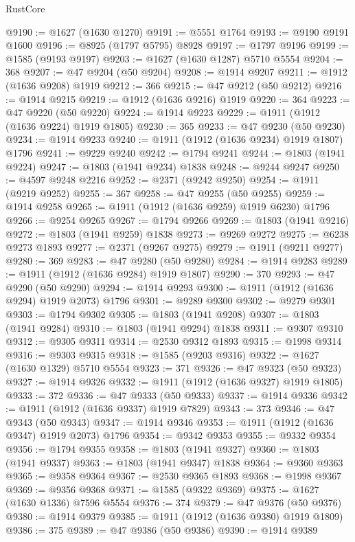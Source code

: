 \begin{lexlean}{RustCore}
\begin{coremodule}
@9190 := @1627 (@1630 @1270)
@9191 := @5551 @1764
@9193 := @9190 @9191 @1600
@9196 := @8925 (@1797 @5795) @8928
@9197 := @1797 @9196
@9199 := @1585 (@9193 @9197)
@9203 := @1627 (@1630 @1287) @5710 @5554
@9204 := 368
@9207 := @47 @9204 (@50 @9204)
@9208 := @1914 @9207
@9211 := @1912 (@1636 @9208) @1919
@9212 := 366
@9215 := @47 @9212 (@50 @9212)
@9216 := @1914 @9215
@9219 := @1912 (@1636 @9216) @1919
@9220 := 364
@9223 := @47 @9220 (@50 @9220)
@9224 := @1914 @9223
@9229 := @1911 (@1912 (@1636 @9224) @1919 @1805)
@9230 := 365
@9233 := @47 @9230 (@50 @9230)
@9234 := @1914 @9233
@9240 := @1911 (@1912 (@1636 @9234) @1919 @1807) @1796
@9241 := @9229 @9240
@9242 := @1794 @9241
@9244 := @1803 (@1941 @9224)
@9247 := @1803 (@1941 @9234) @1838
@9248 := @9244 @9247
@9250 := @4597 @9248 @2216
@9252 := @2371 (@9242 @9250)
@9254 := @1911 (@9219 @9252)
@9255 := 367
@9258 := @47 @9255 (@50 @9255)
@9259 := @1914 @9258
@9265 := @1911 (@1912 (@1636 @9259) @1919 @6230) @1796
@9266 := @9254 @9265
@9267 := @1794 @9266
@9269 := @1803 (@1941 @9216)
@9272 := @1803 (@1941 @9259) @1838
@9273 := @9269 @9272
@9275 := @6238 @9273 @1893
@9277 := @2371 (@9267 @9275)
@9279 := @1911 (@9211 @9277)
@9280 := 369
@9283 := @47 @9280 (@50 @9280)
@9284 := @1914 @9283
@9289 := @1911 (@1912 (@1636 @9284) @1919 @1807)
@9290 := 370
@9293 := @47 @9290 (@50 @9290)
@9294 := @1914 @9293
@9300 := @1911 (@1912 (@1636 @9294) @1919 @2073) @1796
@9301 := @9289 @9300
@9302 := @9279 @9301
@9303 := @1794 @9302
@9305 := @1803 (@1941 @9208)
@9307 := @1803 (@1941 @9284)
@9310 := @1803 (@1941 @9294) @1838
@9311 := @9307 @9310
@9312 := @9305 @9311
@9314 := @2530 @9312 @1893
@9315 := @1998 @9314
@9316 := @9303 @9315
@9318 := @1585 (@9203 @9316)
@9322 := @1627 (@1630 @1329) @5710 @5554
@9323 := 371
@9326 := @47 @9323 (@50 @9323)
@9327 := @1914 @9326
@9332 := @1911 (@1912 (@1636 @9327) @1919 @1805)
@9333 := 372
@9336 := @47 @9333 (@50 @9333)
@9337 := @1914 @9336
@9342 := @1911 (@1912 (@1636 @9337) @1919 @7829)
@9343 := 373
@9346 := @47 @9343 (@50 @9343)
@9347 := @1914 @9346
@9353 := @1911 (@1912 (@1636 @9347) @1919 @2073) @1796
@9354 := @9342 @9353
@9355 := @9332 @9354
@9356 := @1794 @9355
@9358 := @1803 (@1941 @9327)
@9360 := @1803 (@1941 @9337)
@9363 := @1803 (@1941 @9347) @1838
@9364 := @9360 @9363
@9365 := @9358 @9364
@9367 := @2530 @9365 @1893
@9368 := @1998 @9367
@9369 := @9356 @9368
@9371 := @1585 (@9322 @9369)
@9375 := @1627 (@1630 @1336) @7596 @5554
@9376 := 374
@9379 := @47 @9376 (@50 @9376)
@9380 := @1914 @9379
@9385 := @1911 (@1912 (@1636 @9380) @1919 @1809)
@9386 := 375
@9389 := @47 @9386 (@50 @9386)
@9390 := @1914 @9389

\end{coremodule}
\end{lexlean}
